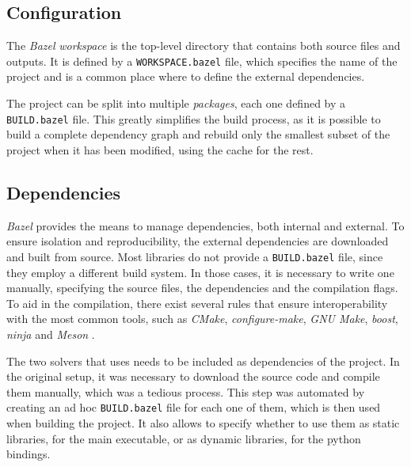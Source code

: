 \subsection{Configuration}

The \textit{Bazel} \textit{workspace} is the top-level directory that contains both source files and outputs.
It is defined by a \texttt{WORKSPACE.bazel} file, which specifies the name of the project and is a common place where to define the external dependencies.



The project can be split into multiple \textit{packages}, each one defined by a \texttt{BUILD.bazel} file.
This greatly simplifies the build process, as it is possible to build a complete dependency graph and rebuild only the smallest subset of the project when it has been modified, using the cache for the rest.



\subsection{Dependencies}

\textit{Bazel} provides the means to manage dependencies, both internal and external.
To ensure isolation and reproducibility, the external dependencies are downloaded and built from source.
Most libraries do not provide a \texttt{BUILD.bazel} file, since they employ a different build system.
In those cases, it is necessary to write one manually, specifying the source files, the dependencies and the compilation flags.
To aid in the compilation, there exist several rules that ensure interoperability with the most common tools, such as \textit{CMake}, \textit{configure-make}, \textit{GNU Make}, \textit{boost}, \textit{ninja} and \textit{Meson} \cite{repo:rules-foreign-cc}.



The two solvers that \dlinear uses needs to be included as dependencies of the project.
In the original setup, it was necessary to download the source code and compile them manually, which was a tedious process.
This step was automated by creating an ad hoc \texttt{BUILD.bazel} file for each one of them, which is then used when building the project.
It also allows to specify whether to use them as static libraries, for the main executable, or as dynamic libraries, for the python bindings.

